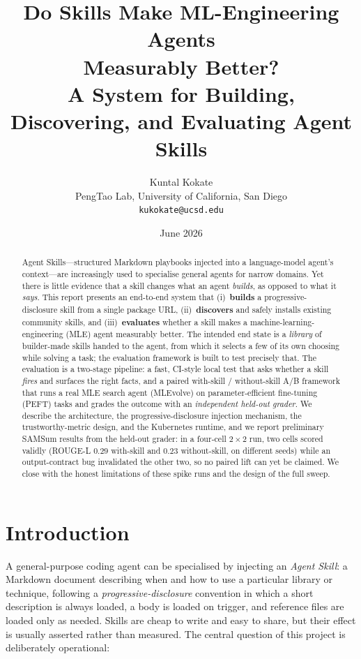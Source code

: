 \documentclass[11pt,a4paper]{article}
\title{\vspace{-1.0cm}\textbf{\color{navy} Do Skills Make ML-Engineering Agents\\[2pt] Measurably Better?}\\[6pt]
\large A System for Building, Discovering, and Evaluating Agent Skills}
\author{Kuntal Kokate\\[2pt]
\normalsize PengTao Lab, University of California, San Diego\\
\normalsize \texttt{kukokate@ucsd.edu}}
\date{June 2026}
\begin{document}
\maketitle

\begin{abstract}
\noindent
Agent Skills---structured Markdown playbooks injected into a language-model agent's
context---are increasingly used to specialise general agents for narrow domains.
Yet there is little evidence that a skill changes what an agent \emph{builds},
as opposed to what it \emph{says}. This report presents an end-to-end system that
(i)~\textbf{builds} a progressive-disclosure skill from a single package URL,
(ii)~\textbf{discovers} and safely installs existing community skills, and
(iii)~\textbf{evaluates} whether a skill makes a machine-learning-engineering (MLE)
agent measurably better. The intended end state is a \emph{library} of builder-made
skills handed to the agent, from which it selects a few of its own choosing while
solving a task; the evaluation framework is built to test precisely that. The
evaluation is a two-stage pipeline: a fast, CI-style
local test that asks whether a skill \emph{fires} and surfaces the right facts, and
a paired with-skill / without-skill A/B framework that runs a real MLE search agent
(MLEvolve) on parameter-efficient fine-tuning (PEFT) tasks and grades the outcome
with an \emph{independent held-out grader}. We describe the architecture, the
progressive-disclosure injection mechanism, the trustworthy-metric design, and the
Kubernetes runtime, and we report preliminary SAMSum results from the held-out grader:
in a four-cell $2\times2$ run, two cells scored validly (ROUGE-L $0.29$ with-skill and
$0.23$ without-skill, on different seeds) while an output-contract bug invalidated the
other two, so no paired lift can yet be claimed. We close with the honest
limitations of these spike runs and the design of the full sweep.
\end{abstract}

\section{Introduction}

A general-purpose coding agent can be specialised by injecting an \emph{Agent Skill}:
a Markdown document describing when and how to use a particular library or technique,
following a \emph{progressive-disclosure} convention in which a short description is
always loaded, a body is loaded on trigger, and reference files are loaded only as
needed. Skills are cheap to write and easy to share, but their effect is usually
asserted rather than measured. The central question of this project is deliberately
operational:
\end{document}
